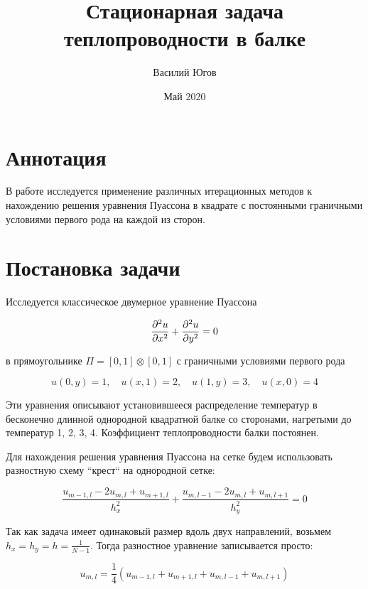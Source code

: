 \documentclass[report , a4paper, onecolumn, 12pt]{article}
\title{Стационарная задача теплопроводности в балке}
\author{Василий Югов}
\date{Май 2020}
\begin{document}
\maketitle

\tableofcontents

\section{Аннотация}

В работе исследуется применение различных итерационных методов к нахождению решения уравнения Пуассона в квадрате с постоянными граничными условиями первого рода на каждой из сторон.

\section{Постановка задачи}

Исследуется классическое двумерное уравнение Пуассона

\begin{equation}
 \pdv[2]{u}{x}(x,y)+\pdv[2]{u}{y}(x,y)=0
\end{equation}

 в прямоугольнике $\Pi = [0, 1] \otimes [0, 1]$ с граничными условиями первого рода

\begin{equation}
 \label{boundary}u(0, y) = 1, \quad u(x, 1) = 2, \quad u(1, y) = 3, \quad u(x, 0) = 4
\end{equation}

Эти уравнения описывают установившееся распределение температур в бесконечно длинной однородной квадратной балке со сторонами, нагретыми до температур 1, 2, 3, 4. Коэффициент теплопроводности балки постоянен. 

Для нахождения решения уравнения Пуассона на сетке будем использовать разностную схему ``крест`` на однородной сетке:

\begin{equation}
 \frac{u_{m - 1, l} - 2 u_{m, l} + u_{m + 1, l}}{h_x^2} + \frac{u_{m,l-1} - 2 u_{m, l} + u_{m, l+1}}{h_y^2} = 0
\end{equation}


Так как задача имеет одинаковый размер вдоль двух направлений, возьмем $h_x = h_y = h = \frac{1}{N - 1}$. Тогда разностное уравнение записывается просто:

\begin{equation}
 \label{cross}u_{m, l} = \frac{1}{4}(u_{m - 1, l} + u_{m + 1, l} + u_{m,l-1} + u_{m, l+1})
\end{equation}
\end{document}

